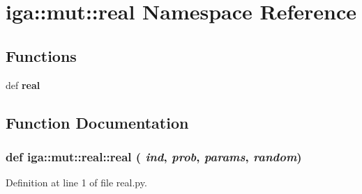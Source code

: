 \section{iga::mut::real Namespace Reference}
\label{namespaceiga_1_1mut_1_1real}


\subsection*{Functions}
\begin{CompactItemize}
\item 
def {\bf real}
\end{CompactItemize}


\subsection{Function Documentation}
\subsubsection{\setlength{\rightskip}{0pt plus 5cm}def iga::mut::real::real ( {\em ind},  {\em prob},  {\em params},  {\em random})}\label{namespaceiga_1_1mut_1_1real_593c06fb6bba0f5b9a3dc1d07dd88642}




Definition at line 1 of file real.py.